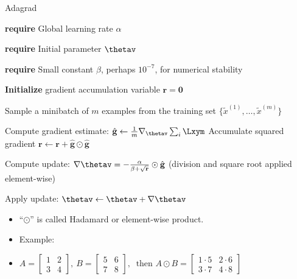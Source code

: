 \documentclass[11pt,compress,t,notes=noshow, xcolor=table]{beamer}
\begin{document}
\begin{vbframe}{Adagrad}
  
  \begin{algorithm}[H]
    \small
    \caption{Adagrad}
    \begin{algorithmic}[1]
    \scriptsize 
    \State \textbf{require} Global learning rate $\alpha$ \strut
    \State \textbf{require} Initial parameter $\thetav$ \strut
    \State \textbf{require} Small constant $\beta$, perhaps $10^{-7}$, for numerical stability \strut
    \State \textbf{Initialize} gradient accumulation variable $\mathbf{r} = \mathbf{0} $
         \State \parbox[t]{\dimexpr\linewidth-\algorithmicindent}{Sample a minibatch of $m$ examples from the training set $\{\tilde{x}^{(1)},\dots,\tilde{x}^{(m)}\}$ \strut}
         \State Compute gradient estimate: $\hat{\mathbf{g}} \leftarrow \frac{1}{m} \nabla_{\thetav} \sum_{i} \Lxym$
         \State Accumulate squared gradient $\mathbf{r} \leftarrow \mathbf{r} + \hat{\mathbf{g}} \odot  \hat{\mathbf{g}}$
         \State \parbox[t]{\dimexpr\linewidth-\algorithmicindent}{Compute update: $\nabla \thetav = - \frac{\alpha}{\beta + \sqrt\mathbf{r}} \odot \hat{\mathbf{g}}$ (division and square root applied element-wise) \strut}
         \State Apply update: $\thetav \leftarrow \thetav + \nabla\thetav$
       \EndWhile
    \end{algorithmic}
  \end{algorithm}
  \begin{itemize}
  \small
    \item \enquote{$\odot$} is called Hadamard or element-wise product.
    \item Example:
    \vspace{0.2cm}
    \item[] $A =
            \begin{bmatrix}
              1 & 2 \\
              3 & 4
            \end{bmatrix}, \ 
            B =
            \begin{bmatrix}
              5 & 6 \\
              7 & 8
            \end{bmatrix}, \ \text{ then } A \odot B =
            \begin{bmatrix}
              1 \cdot 5 & 2 \cdot 6 \\
              3 \cdot 7 & 4 \cdot 8
            \end{bmatrix}$
  \end{itemize}
\end{vbframe}
\end{document}
